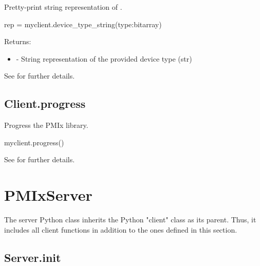 \summary

Pretty-print string representation of .

\format

\pyspecificstart
\begin{codepar}
rep = myclient.device_type_string(type:bitarray)
\end{codepar}
\pyspecificend

\begin{arglist}
\end{arglist}

Returns:
\begin{itemize}
    \item {} - String representation of the provided device type (str)
\end{itemize}

See  for further details.


\subsection{Client.progress}

\summary

Progress the \ac{PMIx} library.

\format

\pyspecificstart
\begin{codepar}
myclient.progress()
\end{codepar}
\pyspecificend


See  for further details.


\section{PMIxServer}
\label{app:python:server}

The server Python class inherits the Python "client" class as its parent. Thus, it includes all client functions in addition to the ones defined in this section.

\subsection{Server.init}

